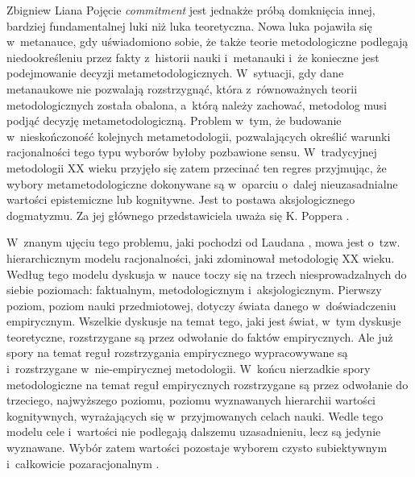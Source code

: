 \begin{artplenv}{Zbigniew Liana}
Pojęcie \textit{commitment} jest jednakże próbą domknięcia innej, bardziej fundamentalnej luki niż luka teoretyczna. Nowa luka pojawiła się w~metanauce, gdy uświadomiono sobie, że także teorie metodologiczne podlegają niedookreśleniu przez fakty z~historii nauki i~metanauki i~że konieczne jest podejmowanie decyzji metametodologicznych. W~sytuacji, gdy dane metanaukowe nie pozwalają rozstrzygnąć, która z~równoważnych teorii metodologicznych została obalona, a~którą należy zachować, metodolog musi podjąć decyzję metametodologiczną. Problem w~tym, że budowanie w~nieskończoność kolejnych metametodologii, pozwalających określić warunki racjonalności tego typu wyborów byłoby pozbawione sensu. W~tradycyjnej metodologii XX wieku przyjęło się zatem przecinać ten regres przyjmując, że wybory metametodologiczne dokonywane są w~oparciu o~dalej nieuzasadnialne wartości epistemiczne lub kognitywne. Jest to postawa aksjologicznego dogmatyzmu. Za jej głównego przedstawiciela uważa się K. Poppera
\parencite[zob.][s.~12]{grobler_prawda_1993}.%


W~znanym ujęciu tego problemu, jaki pochodzi od Laudana
\parencite*[][]{laudan_science_1984}, %
 mowa jest o~tzw. hierarchicznym modelu racjonalności, jaki zdominował metodologię XX wieku. Według tego modelu dyskusja w~nauce toczy się na trzech niesprowadzalnych do siebie poziomach: faktualnym, metodologicznym i~aksjologicznym. Pierwszy poziom, poziom nauki przedmiotowej, dotyczy świata danego w~doświadczeniu empirycznym. Wszelkie dyskusje na temat tego, jaki jest świat, w~tym dyskusje teoretyczne, rozstrzygane są przez odwołanie do faktów empirycznych. Ale już spory na temat reguł rozstrzygania empirycznego wypracowywane są i~rozstrzygane w~nie-empirycznej metodologii. W~końcu nierzadkie spory metodologiczne na temat reguł empirycznych rozstrzygane są przez odwołanie do trzeciego, najwyższego poziomu, poziomu wyznawanych hierarchii wartości kognitywnych, wyrażających się w~przyjmowanych celach nauki. Wedle tego modelu cele i~wartości nie podlegają dalszemu uzasadnieniu, lecz są jedynie wyznawane. Wybór zatem wartości pozostaje wyborem czysto subiektywnym i~całkowicie pozaracjonalnym 
\parencites[zob.][s.~23–26.39–41.47–50]{laudan_science_1984}[][s.~2022]{grobler_prawda_1993}.%



\end{artplenv}
